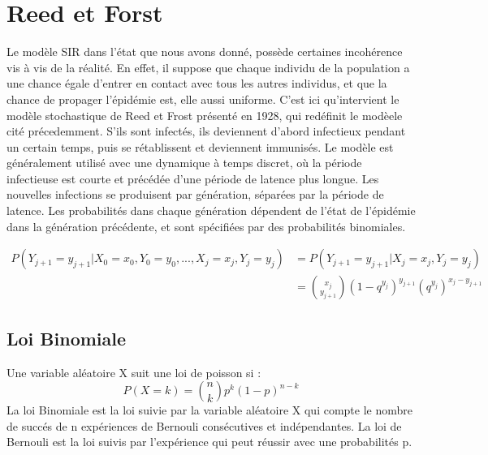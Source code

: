 \section{Reed et Forst}

Le modèle SIR dans l’état que nous avons donné, possède certaines incohérence vis à vis
de la réalité. En effet, il suppose que chaque individu de la population a une chance égale d'entrer
en contact avec tous les autres individus, et que la chance de propager l’épidémie est, elle aussi uniforme.
C’est ici qu’intervient le modèle stochastique de Reed et Frost présenté en 1928, qui redéfinit le
modèele cité précedemment. S'ils sont infectés, ils deviennent d'abord infectieux pendant un certain
temps, puis se rétablissent et deviennent immunisés. Le modèle est généralement utilisé avec une
dynamique à temps discret, où la période infectieuse est courte et précédée d'une période de latence
plus longue. Les nouvelles infections se produisent par génération, séparées par la période de
latence. Les probabilités dans chaque génération dépendent de l'état de l'épidémie dans la
génération précédente, et sont spécifiées par des probabilités binomiales.

\begin{align}
P(Y_{j+1} = y_{j+1} | X_0 = x_0, Y_0 = y_0, ..., X_j = x_j, Y_j = y_j) &= P(Y_{j+1} = y_{j+1} | X_j = x_j, Y_j = y_j) \\
&= \binom{x_j}{y_{j+1}}(1 - q^{y_j})^{y_{j+1}}(q^{y_j})^{x_j - y_{j+1}}
\end{align}

\subsection{Loi Binomiale}

Une variable aléatoire X suit une loi de poisson si :
$$ P(X = k) = \binom{n}{k}p^k(1 - p)^{n-k} $$
La loi Binomiale est la loi suivie par la variable aléatoire X qui compte le nombre de succés de n expériences de Bernouli consécutives et indépendantes.
La loi de Bernouli est la loi suivis par l'expérience qui peut réussir avec une probabilités p.
